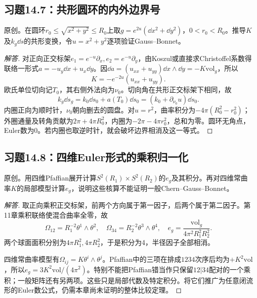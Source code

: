\subsection*{习题14.7：共形圆环的内外边界号}
原创。在圆环$r_0\leq\sqrt{x^2+y^2}\leq R_0$上取$g=e^{2u}(\dd x^2+\dd y^2)$，$0<r_0<R_0$。推导$K$及$k_g\dd s$的共形变换，令$u=x^2+y^2$逐项验证Gauss--Bonnet。
\begin{proof}[解答]
对正向正交标架$e_1=e^{-u}\partial_x,e_2=e^{-u}\partial_y$，由Koszul或直接求Christoffel系数得联络一形式$a=-u_y\dd x+u_x\dd y$。因$\dd a=(u_{xx}+u_{yy})\dd x\wedge\dd y=-K\mathrm{vol}_g$，所以
\[
 K=-e^{-2u}(u_{xx}+u_{yy}).
\]
欧氏单位切向记$T_0$，其右侧外法向为$\nu_0$。切向角在共形正交标架下相同，故
\[
 k_g\dd s_g=k_0\dd s_0+a(T_0)\dd s_0
             =(k_0+\partial_{\nu_0}u)\dd s_0.
\]
内圈正向为顺时针，$\nu_0$朝向删去的圆盘。对$u=r^2$，曲率积分为$-4\pi(R_0^2-r_0^2)$；外圈通量及转角贡献为$2\pi+4\pi R_0^2$，内圈为$-2\pi-4\pi r_0^2$，总和为零。圆环无角点，Euler数为0。若内圈也取逆时针，就会破坏边界相消及这一等式。
\end{proof}

\subsection*{习题14.8：四维Euler形式的乘积归一化}
原创。用四维Pfaffian展开计算$S^2(R_1)\times S^2(R_2)$的$e_g$及其积分。再对四维常曲率$K$的局部模型计算$e_g$，说明这些核算不能证明一般Chern--Gauss--Bonnet。
\begin{proof}[解答]
取正向乘积正交标架，前两个方向属于第一因子，后两个属于第二因子。第11章乘积联络使混合曲率全零，故
\[
 \Omega_{12}=R_1^{-2}\theta^1\wedge\theta^2,\quad
 \Omega_{34}=R_2^{-2}\theta^3\wedge\theta^4,\quad
 e_g=\frac{\mathrm{vol}_g}{4\pi^2R_1^2R_2^2}.
\]
两个球面面积分别为$4\pi R_1^2,4\pi R_2^2$，于是积分为4，半径因子全部相消。

四维常曲率模型有$\Omega_{ij}=K\theta^i\wedge\theta^j$。Pfaffian中的三项在排成$1234$次序后均为$+K^2\mathrm{vol}$，所以$e_g=3K^2\mathrm{vol}/(4\pi^2)$。特别不能把Pfaffian错当作只保留$12|34$配对的一个乘积；一般矩阵还有另两项。这些只是局部代数及特定积分。将它们推广为任意闭流形的Euler数公式，仍需本章尚未证明的整体比较定理。
\end{proof}
